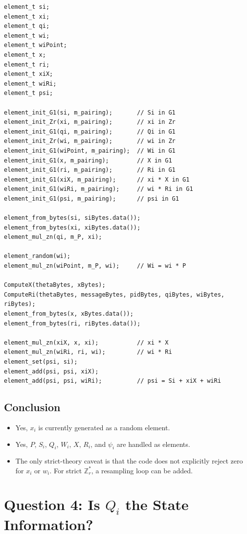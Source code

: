 \documentclass[11pt,a4paper]{article}
\newcommand{\codepath}[1]{\path{#1}}
\begin{document}
\begin{lstlisting}[style=cppstyle,caption={Signature generation uses Zr scalars and G1 group elements.}]
element_t si;
element_t xi;
element_t qi;
element_t wi;
element_t wiPoint;
element_t x;
element_t ri;
element_t xiX;
element_t wiRi;
element_t psi;

element_init_G1(si, m_pairing);       // Si in G1
element_init_Zr(xi, m_pairing);       // xi in Zr
element_init_G1(qi, m_pairing);       // Qi in G1
element_init_Zr(wi, m_pairing);       // wi in Zr
element_init_G1(wiPoint, m_pairing);  // Wi in G1
element_init_G1(x, m_pairing);        // X in G1
element_init_G1(ri, m_pairing);       // Ri in G1
element_init_G1(xiX, m_pairing);      // xi * X in G1
element_init_G1(wiRi, m_pairing);     // wi * Ri in G1
element_init_G1(psi, m_pairing);      // psi in G1

element_from_bytes(si, siBytes.data());
element_from_bytes(xi, xiBytes.data());
element_mul_zn(qi, m_P, xi);

element_random(wi);
element_mul_zn(wiPoint, m_P, wi);     // Wi = wi * P

ComputeX(thetaBytes, xBytes);
ComputeRi(thetaBytes, messageBytes, pidBytes, qiBytes, wiBytes, riBytes);
element_from_bytes(x, xBytes.data());
element_from_bytes(ri, riBytes.data());

element_mul_zn(xiX, x, xi);           // xi * X
element_mul_zn(wiRi, ri, wi);         // wi * Ri
element_set(psi, si);
element_add(psi, psi, xiX);
element_add(psi, psi, wiRi);          // psi = Si + xiX + wiRi
\end{lstlisting}

\subsection{Conclusion}

\begin{itemize}[leftmargin=*]
  \item Yes, \(x_i\) is currently generated as a random \codepath{Zr} element.
  \item Yes, \(P\), \(S_i\), \(Q_i\), \(W_i\), \(X\), \(R_i\), and \(\psi_i\) are handled as \codepath{G1} elements.
  \item The only strict-theory caveat is that the code does not explicitly reject zero for \(x_i\) or \(w_i\). For strict \(\mathbb{Z}_r^*\), a resampling loop can be added.
\end{itemize}

\section{Question 4: Is \texorpdfstring{\(Q_i\)}{Qi} the State Information?}
\end{document}
